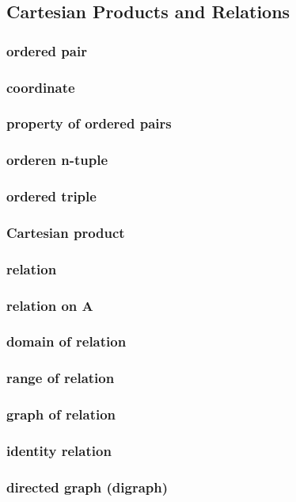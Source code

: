 \documentclass[a4paper]{article}
\begin{document}
\subsection{Cartesian Products and Relations}   %
\subsubsection*{ordered pair}
\subsubsection*{coordinate}
\subsubsection*{property of ordered pairs}
\subsubsection*{orderen n-tuple}
\subsubsection*{ordered triple}
\subsubsection*{Cartesian product}
\subsubsection*{relation}
\subsubsection*{relation on A}
\subsubsection*{domain of relation}
\subsubsection*{range of relation}
\subsubsection*{graph of relation}
\subsubsection*{identity relation}
\subsubsection*{directed graph (digraph)}
\end{document}
